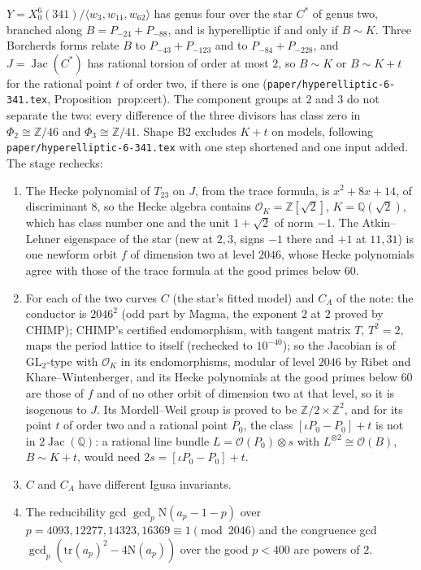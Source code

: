 \documentclass[11pt,reqno]{amsart}
\theoremstyle{plain}
\theoremstyle{definition}
\DeclareMathOperator{\Jac}{Jac}
\newcommand{\Q}{\mathbb{Q}}
\newcommand{\Z}{\mathbb{Z}}
\begin{document}
$Y=X_0^6(341)/\langle w_3,w_{11},w_{62}\rangle$ has genus four over the star $C^*$ of genus two, branched along
$B=P_{-24}+P_{-88}$, and is hyperelliptic if and only if $B\sim K$. Three Borcherds forms relate $B$ to
$P_{-43}+P_{-123}$ and to $P_{-84}+P_{-228}$, and $J=\Jac(C^*)$ has rational torsion of order at most $2$, so
$B\sim K$ or $B\sim K+t$ for the rational point $t$ of order two, if there is one
(\texttt{paper/hyperelliptic-6-341.tex}, Proposition~prop:cert). The component groups at $2$ and $3$ do not
separate the two: every difference of the three divisors has class zero in $\Phi_2\cong\Z/46$ and $\Phi_3\cong\Z/41$.
Shape B2 excludes $K+t$ on models, following \texttt{paper/hyperelliptic-6-341.tex} with one step shortened and one
input added. The stage rechecks:
\begin{enumerate}
\item The Hecke polynomial of $T_{23}$ on $J$, from the trace formula, is $x^2+8x+14$, of discriminant $8$, so the
Hecke algebra contains $\mathcal O_K=\Z[\sqrt2]$, $K=\Q(\sqrt2)$, which has class number one and the unit $1+\sqrt2$
of norm $-1$. The Atkin--Lehner eigenspace of the star (new at $2,3$, signs $-1$ there and $+1$ at $11,31$) is one
newform orbit $f$ of dimension two at level $2046$, whose Hecke polynomials agree with those of the trace formula
at the good primes below $60$.
\item For each of the two curves $C$ (the star's fitted model) and $C_A$ of the note: the conductor is
$2046^2$ (odd part by Magma, the exponent $2$ at $2$ proved by CHIMP); CHIMP's certified endomorphism, with tangent
matrix $T$, $T^2=2$, maps the period lattice to itself (rechecked to $10^{-40}$); so the Jacobian is of
$\mathrm{GL}_2$-type with $\mathcal O_K$ in its endomorphisms, modular of level $2046$ by Ribet and Khare--Wintenberger,
and its Hecke polynomials at the good primes below $60$ are those of $f$ and of no other orbit of dimension two
at that level, so it is isogenous to $J$. Its Mordell--Weil group is proved to be $\Z/2\times\Z^2$, and for its
point $t$ of order two and a rational point $P_0$, the class $[\iota P_0-P_0]+t$ is not in $2\Jac(\Q)$: a rational
line bundle $L=\mathcal O(P_0)\otimes s$ with $L^{\otimes2}\cong\mathcal O(B)$, $B\sim K+t$, would need
$2s=[\iota P_0-P_0]+t$.
\item $C$ and $C_A$ have different Igusa invariants.
\item The reducibility gcd $\gcd_p \mathrm N(a_p-1-p)$ over $p=4093,12277,14323,16369\equiv1\pmod{2046}$ and the congruence
gcd $\gcd_p(\mathrm{tr}(a_p)^2-4\mathrm N(a_p))$ over the good $p<400$ are powers of $2$.
\end{enumerate}
\end{document}

